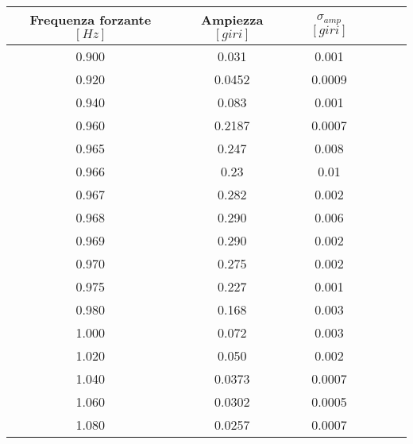 \begin{tabular}{cccccc}
\toprule
Frequenza forzante $[Hz]$ & Ampiezza $[giri]$ & $\sigma_{amp}$ $[giri]$\\ \midrule
0.900 & 0.031 & 0.001\\ \midrule
0.920 & 0.0452 & 0.0009\\ \midrule
0.940 & 0.083 & 0.001\\ \midrule
0.960 & 0.2187 & 0.0007\\ \midrule
0.965 & 0.247 & 0.008\\ \midrule
0.966 & 0.23 & 0.01\\ \midrule
0.967 & 0.282 & 0.002\\ \midrule
0.968 & 0.290 & 0.006\\ \midrule
0.969 & 0.290 & 0.002\\ \midrule
0.970 & 0.275 & 0.002\\ \midrule
0.975 & 0.227 & 0.001\\ \midrule
0.980 & 0.168 & 0.003\\ \midrule
1.000 & 0.072 & 0.003\\ \midrule
1.020 & 0.050 & 0.002\\ \midrule
1.040 & 0.0373 & 0.0007\\ \midrule
1.060 & 0.0302 & 0.0005\\ \midrule
1.080 & 0.0257 & 0.0007\\ \bottomrule
\end{tabular}
